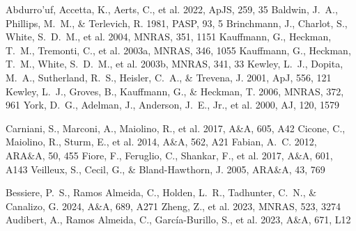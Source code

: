 \documentclass[twocolumn]{aastex631}
\begin{document}
\begin{thebibliography}{}
 Abdurro'uf, Accetta, K., Aerts, C., et al. 2022, ApJS, 259, 35
 Baldwin, J.~A., Phillips, M.~M., \& Terlevich, R. 1981, PASP, 93, 5
 Brinchmann, J., Charlot, S., White, S.~D.~M., et al. 2004, MNRAS, 351, 1151
 Kauffmann, G., Heckman, T.~M., Tremonti, C., et al. 2003a, MNRAS, 346, 1055
 Kauffmann, G., Heckman, T.~M., White, S.~D.~M., et al. 2003b, MNRAS, 341, 33
 Kewley, L.~J., Dopita, M.~A., Sutherland, R.~S., Heisler, C.~A., \& Trevena, J. 2001, ApJ, 556, 121
 Kewley, L.~J., Groves, B., Kauffmann, G., \& Heckman, T. 2006, MNRAS, 372, 961
 York, D.~G., Adelman, J., Anderson, J.~E., Jr., et al. 2000, AJ, 120, 1579

 Carniani, S., Marconi, A., Maiolino, R., et al. 2017, A\&A, 605, A42
 Cicone, C., Maiolino, R., Sturm, E., et al. 2014, A\&A, 562, A21
 Fabian, A.~C. 2012, ARA\&A, 50, 455
 Fiore, F., Feruglio, C., Shankar, F., et al. 2017, A\&A, 601, A143
 Veilleux, S., Cecil, G., \& Bland-Hawthorn, J. 2005, ARA\&A, 43, 769

 Bessiere, P.~S., Ramos Almeida, C., Holden, L.~R., Tadhunter, C.~N., \& Canalizo, G. 2024, A\&A, 689, A271
 Zheng, Z., et al. 2023, MNRAS, 523, 3274
 Audibert, A., Ramos Almeida, C., García-Burillo, S., et al. 2023, A\&A, 671, L12
\end{thebibliography}
\end{document}
